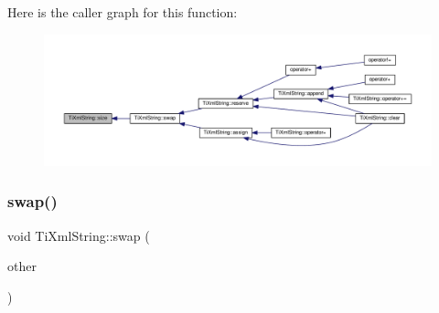 Here is the caller graph for this function\+:\nopagebreak
\begin{figure}[H]
\begin{center}
\leavevmode
\includegraphics[width=350pt]{class_ti_xml_string_a483d85103d2a3ba8c0831e205c832f33_icgraph}
\end{center}
\end{figure}
\mbox{\label{class_ti_xml_string_aa392cbc180752a79f007f4f9280c7762}} 
\subsubsection{\texorpdfstring{swap()}{swap()}}
{\footnotesize\ttfamily void Ti\+Xml\+String\+::swap (\begin{DoxyParamCaption}\item[{\hyperlink{class_ti_xml_string}{Ti\+Xml\+String} \&}]{other }\end{DoxyParamCaption})\hspace{0.3cm}{\ttfamily [inline]}}

